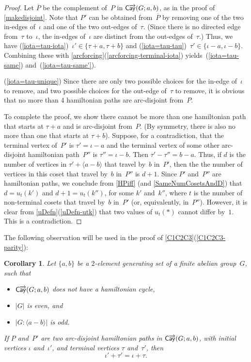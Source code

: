 \documentclass[11pt]{amsart}
\newtheorem{cor}[equation]{Corollary}
\newcommand{\fullcref}[2]{\cref{#1}(\ref{#1-#2})}
\theoremstyle{definition}
\numberwithin{case}{startcases}
\numberwithin{equation}{section}
\newcommand{\cayd}{\mathop{\mathsf{C}\mkern-1mu\overrightarrow{\mathsf{ay}}}}
\begin{document}
	\begin{proof}
		Let $\overline P$ be the complement of~$P$ in $\cayd(G; a,b)$, as in the proof of \cref{makedisjoint}. Note that $P'$ can be obtained from~$\overline P$ by removing one of the two in-edges of~$\iota$ and one of the two out-edges of~$\tau$. (Since there is no directed edge from~$\tau$ to~$\iota$, the in-edges of~$\iota$ are distinct from the out-edges of~$\tau$.) Thus, we have 
		(\ref{iota=tau-iota})~$\iota' \in \{\tau + a, \tau + b\}$
		and
		(\ref{iota=tau-tau})~$\tau' \in \{\iota - a, \iota - b\}$.
		Combining these with \fullcref{arcforcing}{terminal-iota} yields~(\ref{iota=tau-same}) and~(\ref{iota=tau-same'}).
		
		(\ref{iota=tau-unique}) Since there are only two possible choices for the in-edge of~$\iota$ to remove, and two possible choices for the out-edge of~$\tau$ to remove, it is obvious that no more than 4 hamiltonian paths are arc-disjoint from~$P$. 
		
		To complete the proof, we show there cannot be more than one hamiltonian path that starts at $\tau + a$ and is arc-disjoint from~$P$. (By symmetry, there is also no more than one that starts at $\tau + b$). Suppose, for a contradiction, that the terminal vertex of~$P'$ is $\tau' = \iota - a$ and the terminal vertex of some other arc-disjoint hamiltonian path~$P''$ is $\tau'' = \iota - b$. Then $\tau' - \tau'' = b - a$. Thus, if $d$ is the number of vertices in $\tau' + \langle a - b \rangle$ that travel by~$b$ in~$P'$, then the the number of vertices in this coset that travel by~$b$ in~$P''$ is $d + 1$. Since $P'$ and~$P''$ are hamiltonian paths, we conclude from \cref{HPiff} (and \cref{SameNumCosetsAndD}) that $d = u_t(k')$ and $d + 1 = u_t(k'')$, for some $k'$ and~$k''$, where $t$ is the number of non-terminal cosets that travel by~$b$ in~$P'$ (or, equivalently, in~$P''$). However, it is clear from \fullcref{uDefn}{utk} that two values of $u_t(*)$ cannot differ by~$1$. This is a contradiction.
	\end{proof}
	
	The following observation will be used in the proof of \fullcref{C1C2C3}{parity}:
	
	\begin{cor} \label{iota+tau}
		Let $\{a,b\}$ be a\/ $2$-element generating set of a finite abelian group~$G$, such that
		\begin{itemize}
			\item $\cayd(G; a,b)$ does not have a hamiltonian cycle,
			\item $|G|$ is even,
			and
			\item $|G : \langle a - b \rangle|$ is odd.
		\end{itemize}
		If $P$ and~$P'$ are two arc-disjoint hamiltonian paths in $\cayd(G; a,b)$, with initial vertices $\iota$ and~$\iota'$, and terminal vertices $\tau$ and~$\tau'$, then
		\[ \iota' + \tau' = \iota + \tau . \]
	\end{cor}
	
\end{document}

